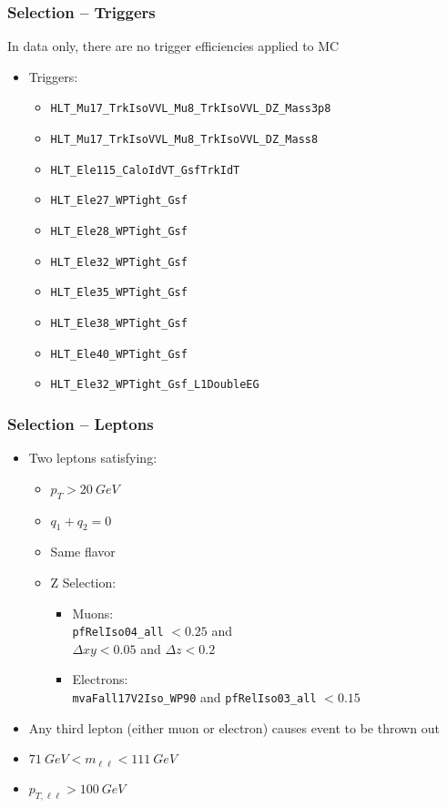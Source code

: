 \documentclass{beamer}
\begin{document}
\begin{frame}
  \frametitle{Selection -- Triggers}

  In data only, there are no trigger efficiencies applied to MC

  \begin{itemize}
  \item Triggers:
    \begin{itemize}
    \item \texttt{HLT\_Mu17\_TrkIsoVVL\_Mu8\_TrkIsoVVL\_DZ\_Mass3p8}
    \item \texttt{HLT\_Mu17\_TrkIsoVVL\_Mu8\_TrkIsoVVL\_DZ\_Mass8}
    \item \texttt{HLT\_Ele115\_CaloIdVT\_GsfTrkIdT}
    \item \texttt{HLT\_Ele27\_WPTight\_Gsf}
    \item \texttt{HLT\_Ele28\_WPTight\_Gsf}
    \item \texttt{HLT\_Ele32\_WPTight\_Gsf}
    \item \texttt{HLT\_Ele35\_WPTight\_Gsf}
    \item \texttt{HLT\_Ele38\_WPTight\_Gsf}
    \item \texttt{HLT\_Ele40\_WPTight\_Gsf}
    \item \texttt{HLT\_Ele32\_WPTight\_Gsf\_L1DoubleEG}
    \end{itemize}
  \end{itemize}

\end{frame}


\begin{frame}
  \frametitle{Selection -- Leptons}

  \begin{itemize}
  \item Two leptons satisfying:
    \begin{itemize}
    \item $p_T > \SI{20}{GeV}$
    \item $q_1 + q_2 = 0$
    \item Same flavor
    \item Z Selection:
      \begin{itemize}
      \item Muons: \\
        \texttt{pfRelIso04\_all} $< 0.25$ and \\
        $\Delta xy < 0.05$ and $\Delta z < 0.2$
      \item Electrons: \\
        \texttt{mvaFall17V2Iso\_WP90} and \texttt{pfRelIso03\_all} $< 0.15$
      \end{itemize}
    \end{itemize}
  \item Any third lepton (either muon or electron) causes event to be thrown out
  \item $\SI{71}{GeV} < m_{\ell\ell} < \SI{111}{GeV}$
  \item $p_{T,\ell\ell} > \SI{100}{GeV}$
  \end{itemize}

\end{frame}
\end{document}
